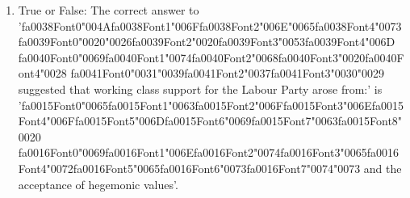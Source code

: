 \documentclass[12pt]{article}
\begin{document}
\begin{enumerate}[label=\arabic*.]
\item True or False: The correct answer to '{\csname fa0038Font0\endcsname\char"004A}{\csname fa0038Font1\endcsname\char"006F}{\csname fa0038Font2\endcsname\char"006E}{\char"0065}{\csname fa0038Font4\endcsname\char"0073} {\csname fa0039Font0\endcsname\char"0020}{\char"0026}{\csname fa0039Font2\endcsname\char"0020}{\csname fa0039Font3\endcsname\char"0053}{\csname fa0039Font4\endcsname\char"006D} {\csname fa0040Font0\endcsname\char"0069}{\csname fa0040Font1\endcsname\char"0074}{\csname fa0040Font2\endcsname\char"0068}{\csname fa0040Font3\endcsname\char"0020}{\csname fa0040Font4\endcsname\char"0028} {\csname fa0041Font0\endcsname\char"0031}{\char"0039}{\csname fa0041Font2\endcsname\char"0037}{\csname fa0041Font3\endcsname\char"0030}{\char"0029} suggested that working class support for the Labour Party arose from:' is '{\csname fa0015Font0\endcsname\char"0065}{\csname fa0015Font1\endcsname\char"0063}{\csname fa0015Font2\endcsname\char"006F}{\csname fa0015Font3\endcsname\char"006E}{\csname fa0015Font4\endcsname\char"006F}{\csname fa0015Font5\endcsname\char"006D}{\csname fa0015Font6\endcsname\char"0069}{\csname fa0015Font7\endcsname\char"0063}{\csname fa0015Font8\endcsname\char"0020} {\csname fa0016Font0\endcsname\char"0069}{\csname fa0016Font1\endcsname\char"006E}{\csname fa0016Font2\endcsname\char"0074}{\csname fa0016Font3\endcsname\char"0065}{\csname fa0016Font4\endcsname\char"0072}{\csname fa0016Font5\endcsname\char"0065}{\csname fa0016Font6\endcsname\char"0073}{\csname fa0016Font7\endcsname\char"0074}{\char"0073} and the acceptance of hegemonic values'.

\end{enumerate}
\end{document}
